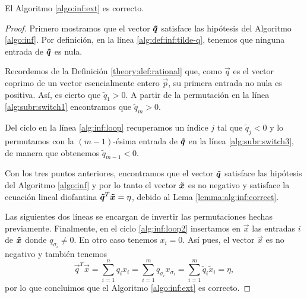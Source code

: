 \begin{theorem}
	\label{th:alg:inf}
	El Algoritmo \ref{algo:inf:ext} es correcto.
\end{theorem}
\begin{proof}
	Primero mostramos que el vector $\boldsymbol{\tilde{q}}$ satisface las hipótesis del Algoritmo
	\ref{algo:inf}. Por definición, en la línea \ref{alg:def:inf:tilde-q}, tenemos que ninguna
	entrada de $\boldsymbol{\tilde{q}}$ es nula.

	Recordemos de la Definición \ref{theory:def:rational} que, como $\vec{q}$ es el vector coprimo
	de un vector esencialmente entero $\vec{p}$, su primera entrada no nula es positiva. Así, es
	cierto que $\tilde{q}_1 > 0$. A partir de la permutación en la línea \ref{alg:subr:switch1}
	encontramos que $\tilde{q}_m > 0$.

	Del ciclo en la línea \ref{alg:inf:loop} recuperamos un índice $j$ tal que $\tilde{q}_j < 0$ y
	lo permutamos con la $(m - 1)$-ésima entrada de $\boldsymbol{\tilde{q}}$ en la línea
	\eqref{alg:subr:switch3}, de manera que obtenemos $\tilde{q}_{m-1} < 0$.

	Con los tres puntos anteriores, encontramos que el vector $\boldsymbol{\tilde{q}}$ satisface las
	hipótesis del Algoritmo \ref{algo:inf} y por lo tanto el vector $\boldsymbol{\tilde{x}}$ es no negativo
	y satisface la ecuación lineal diofantina $\boldsymbol{\tilde{q}}^T\boldsymbol{\tilde{x}} = \eta$, debido al
	Lema \ref{lemma:alg:inf:correct}.

	Las siguientes dos líneas se encargan de invertir las permutaciones hechas previamente.
	Finalmente, en el ciclo \eqref{alg:inf:loop2} insertamos en $\vec{x}$ las entradas $i$ de
	$\boldsymbol{\tilde{x}}$ donde $q_{\sigma_i} \neq 0$. En otro caso tenemos $x_i = 0$. Así pues, el
	vector $\vec{x}$ es no negativo y también tenemos
	\begin{equation*}
		\vec{q}^T\vec{x} = \sum_{i = 1}^{n}q_ix_i
		= \sum_{i = 1}^{m}q_{\sigma_i}x_{\sigma_i}
		= \sum_{i = 1}^{m}\tilde{q}_i\tilde{x}_i
		= \eta,
	\end{equation*}
	por lo que concluimos que el Algoritmo \ref{algo:inf:ext} es correcto.
\end{proof}


